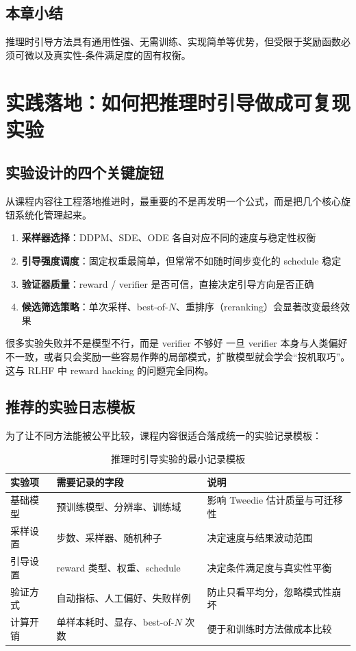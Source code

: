 \documentclass[a4paper]{article}
\begin{document}
\subsection{本章小结}

推理时引导方法具有通用性强、无需训练、实现简单等优势，但受限于奖励函数必须可微以及真实性-条件满足度的固有权衡。

\section{实践落地：如何把推理时引导做成可复现实验}

\subsection{实验设计的四个关键旋钮}

从课程内容往工程落地推进时，最重要的不是再发明一个公式，而是把几个核心旋钮系统化管理起来。

\begin{enumerate}
    \item \textbf{采样器选择}：DDPM、SDE、ODE 各自对应不同的速度与稳定性权衡
    \item \textbf{引导强度调度}：固定权重最简单，但常常不如随时间步变化的 schedule 稳定
    \item \textbf{验证器质量}：reward / verifier 是否可信，直接决定引导方向是否正确
    \item \textbf{候选筛选策略}：单次采样、best-of-$N$、重排序（reranking）会显著改变最终效果
\end{enumerate}

\begin{importantbox}{很多实验失败并不是模型不行，而是 verifier 不够好}
一旦 verifier 本身与人类偏好不一致，或者只会奖励一些容易作弊的局部模式，扩散模型就会学会``投机取巧''。这与 RLHF 中 reward hacking 的问题完全同构。
\end{importantbox}

\subsection{推荐的实验日志模板}

为了让不同方法能被公平比较，课程内容很适合落成统一的实验记录模板：

\begin{table}[H]
\centering
\begin{tabular}{p{} p{} p{}}
\toprule
实验项 & 需要记录的字段 & 说明 \\
\midrule
基础模型 & 预训练模型、分辨率、训练域 & 影响 Tweedie 估计质量与可迁移性 \\
采样设置 & 步数、采样器、随机种子 & 决定速度与结果波动范围 \\
引导设置 & reward 类型、权重、schedule & 决定条件满足度与真实性平衡 \\
验证方式 & 自动指标、人工偏好、失败样例 & 防止只看平均分，忽略模式性崩坏 \\
计算开销 & 单样本耗时、显存、best-of-$N$ 次数 & 便于和训练时方法做成本比较 \\
\bottomrule
\end{tabular}
\caption{推理时引导实验的最小记录模板}
\end{table}
\end{document}
